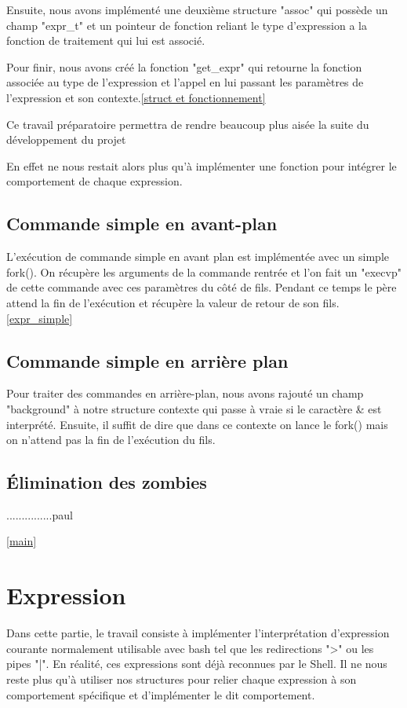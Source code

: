 \documentclass[12pt]{article}
\begin{document}
 Ensuite, nous avons implémenté une deuxième structure "assoc" qui possède un champ "expr\_t"
 et un pointeur de fonction reliant le type d'expression a la fonction de traitement
 qui lui est associé.
 
 Pour finir, nous avons créé la fonction "get\_expr" qui retourne la fonction associée au 
 type de l'expression et l'appel en lui passant les paramètres de l'expression et son 
 contexte.\ref{struct et fonctionnement}
 
 Ce travail préparatoire permettra de rendre beaucoup plus aisée la suite du développement
 du projet
 
 En effet ne nous restait alors plus qu'à implémenter une fonction pour intégrer le comportement
 de chaque expression.
 
 \subsection{Commande simple en avant-plan}
 
 L'exécution de commande simple en avant plan est implémentée avec un simple fork().
 On récupère les arguments de la commande rentrée et l'on fait un "execvp" de cette commande
 avec ces paramètres du côté de fils. Pendant ce temps le père attend la fin de l'exécution
 et récupère la valeur de retour de son fils.\ref{expr_simple}
 
 \subsection{Commande simple en arrière plan}
 
 Pour traiter des commandes en arrière-plan, nous avons rajouté un champ "background"
à notre structure contexte qui passe à vraie si le caractère \& est interprété.
 Ensuite, il suffit de dire que dans ce contexte on lance le fork() mais on n’attend pas
la fin de l'exécution du fils.
 
 
 \subsection{Élimination des zombies}

 ...............paul
 
 \ref{main}
 

\newpage
\section{Expression}

Dans cette partie, le travail consiste à implémenter l'interprétation d'expression courante
normalement utilisable avec bash tel que les redirections ">" ou les pipes "|".
En réalité, ces expressions sont déjà reconnues par le Shell. Il ne nous reste plus qu'à utiliser
nos structures pour relier chaque expression à son comportement spécifique et d'implémenter le
dit comportement.
\end{document}
